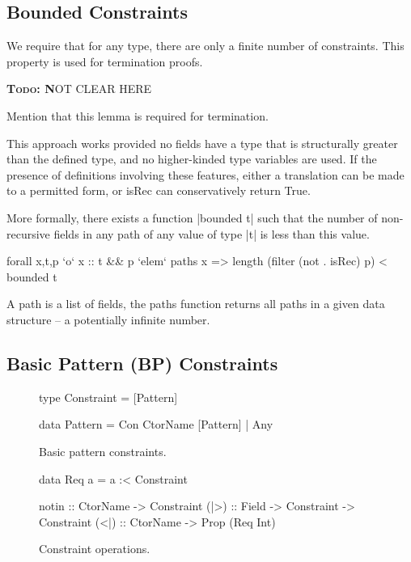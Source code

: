 \documentclass[preprint]{sigplanconf}
\newcommand{\C}[1]{\textsf{#1}}
\newcommand{\todo}[1]{\textbf{\textsc{Todo:} #1}}
\begin{document}
\subsection{Bounded Constraints}
\label{sec:bounded}

We require that for any type, there are only a finite number of constraints. This property is used for termination proofs. 

\todo NOT CLEAR HERE

Mention that this lemma is required for termination.

This approach works provided no fields have a type that is structurally greater than the defined type, and no higher-kinded type variables are used. If the presence of definitions involving these features, either a translation can be made to a permitted form, or \C{isRec} can conservatively return True.

More formally, there exists a function |bounded t| such that the number of non-recursive fields in any path of any value of type |t| is less than this value.

\begin{code}
forall x,t,p `o`  x :: t && p `elem` paths x =>
                  length (filter (not . isRec) p) < bounded t
\end{code}

A path is a list of fields, the \C{paths} function returns all paths in a given data structure -- a potentially infinite number.


\subsection{Basic Pattern (BP) Constraints}
\label{sec:basic}

\begin{figure}
\begin{code}
type Constraint = [Pattern]

data Pattern  =  Con CtorName [Pattern]
              |  Any
\end{code}
\caption{Basic pattern constraints.}
\label{fig:basic}
\end{figure}

\begin{figure}
\begin{code}
data Req a = a :< Constraint

notin :: CtorName -> Constraint
(|>) :: Field -> Constraint -> Constraint
(<|) :: CtorName -> Prop (Req Int)
\end{code}
\caption{Constraint operations.}
\label{fig:constraint}
\end{figure}
\end{document}
